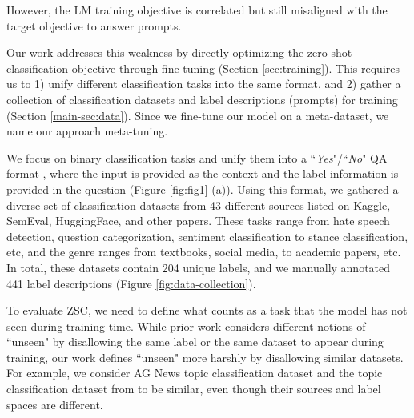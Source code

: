 However, the LM training objective is correlated but still misaligned with the target objective to answer prompts.

Our work addresses this weakness by directly optimizing the zero-shot classification objective through fine-tuning (Section \ref{sec:training}).
This requires us to 1) unify different classification tasks into the same format, and 2) gather a collection of classification datasets and label descriptions (prompts) for training (Section \ref{main-sec:data}).
Since we fine-tune our model on a meta-dataset, we name our approach meta-tuning.

We focus on binary classification tasks and unify them into a ``\textit{Yes}"/``\textit{No}" QA format \cite{clark-etal-2019-boolq, mccann2018natural}, where the input is provided as the context and the label information is provided in the question (Figure \ref{fig:fig1} (a)). Using this format, we gathered a diverse set of classification datasets from 43 different sources listed on Kaggle, SemEval, HuggingFace, and other papers. These tasks range from hate speech detection, question categorization, sentiment classification to stance classification, etc, and the genre ranges from textbooks, social media, to academic papers, etc. In total, these datasets contain 204 unique labels, and we manually annotated 441 label descriptions (Figure \ref{fig:data-collection}).

To evaluate ZSC, we need to define what counts as a task that the model has not seen during training time. While prior work considers different notions of ``unseen" by disallowing the same label or the same dataset to appear during training, our work defines ``unseen" more harshly by disallowing similar datasets. For example, we consider AG News topic classification dataset \cite{10.5555/2969239.2969312} and the topic classification dataset from \citet{yin-etal-2019-benchmarking} to be similar, even though their sources and label spaces are different.

